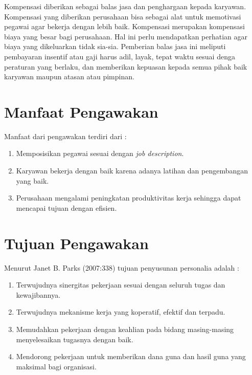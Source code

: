 Kompensasi diberikan sebagai balas jasa dan penghargaan kepada karyawan. Kompensasi yang diberikan perusahaan bisa sebagai alat untuk memotivasi pegawai agar bekerja dengan lebih baik. Kompensasi merupakan kompensasi biaya yang besar bagi perusahaan. Hal ini perlu mendapatkan perhatian agar biaya yang dikeluarkan tidak sia-sia. Pemberian balas jasa ini meliputi pembayaran insentif atau gaji harus adil, layak, tepat waktu sesuai denga peraturan yang berlaku, dan memberikan kepuasan kepada semua pihak baik karyawan maupun atasan atau pimpinan.

\section{Manfaat Pengawakan}

Manfaat dari pengawakan terdiri dari :

\begin{enumerate}

\item Memposisikan pegawai sesuai dengan \textit{job description}.

\item Karyawan bekerja dengan baik karena adanya latihan dan pengembangan yang baik.

\item Perusahaan mengalami peningkatan produktivitas kerja sehingga dapat mencapai tujuan dengan efisien.

\end{enumerate}

\section{Tujuan Pengawakan}

Menurut Janet B. Parks (2007:338) tujuan penyusunan personalia adalah \cite{3} :

\begin{enumerate}

\item Terwujudnya sinergitas pekerjaan sesuai dengan seluruh tugas dan kewajibannya.

\item Terwujudnya mekanisme kerja yang koperatif, efektif dan terpadu.

\item Memudahkan pekerjaan dengan keahlian pada bidang masing-masing menyelesaikan tugasnya dengan baik.

\item Mendorong pekerjaan untuk memberikan dana guna dan hasil guna yang maksimal bagi organisasi.

\end{enumerate}

